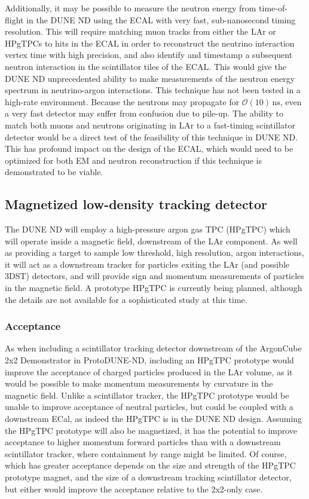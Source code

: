 Additionally, it may be possible to measure the neutron energy from time-of-flight in the DUNE ND using the ECAL with very fast, sub-nanosecond timing resolution. This will require matching muon tracks from either the LAr or HPgTPCs to hits in the ECAL in order to reconstruct the neutrino interaction vertex time with high precision, and also identify and timestamp a subsequent neutron interaction in the scintillator tiles of the ECAL. This would give the DUNE ND unprecedented ability to make measurements of the neutron energy spectrum in neutrino-argon interactions. This technique has not been tested in a high-rate environment. Because the neutrons may propagate for $\mathcal{O}\left(10\right)\,\mathrm{ns}$, even a very fast detector may suffer from confusion due to pile-up. The ability to match both muons and neutrons originating in LAr to a fast-timing scintillator detector would be a direct test of the feasibility of this technique in DUNE ND. This has profound impact on the design of the ECAL, which would need to be optimized for both EM and neutron reconstruction if this technique is demonstrated to be viable.
 
\subsection{Magnetized low-density tracking detector}
The DUNE ND will employ a high-pressure argon gas TPC (HPgTPC) which will operate inside a magnetic field, downstream of the LAr component. As well as providing a target to sample low threshold, high resolution, argon interactions, it will act as a downstream tracker for particles exiting the LAr (and possible 3DST) detectors, and will provide sign and momentum measurements of particles in the magnetic field. A prototype HPgTPC is currently being planned, although the details are not available for a sophisticated study at this time.

\subsubsection{Acceptance}
As when including a scintillator tracking detector downstream of the ArgonCube 2x2 Demonstrator in ProtoDUNE-ND, including an HPgTPC prototype would improve the acceptance of charged particles produced in the LAr volume, as it would be possible to make momentum measurements by curvature in the magnetic field. Unlike a scintillator tracker, the HPgTPC prototype would be unable to improve acceptance of neutral particles, but could be coupled with a downstream ECal, as indeed the HPgTPC is in the DUNE ND design. Assuming the HPgTPC prototype will also be magnetized, it has the potential to improve acceptance to higher momentum forward particles than with a downstream scintillator tracker, where containment by range might be limited. Of course, which has greater acceptance depends on the size and strength of the HPgTPC prototype magnet, and the size of a downstream tracking scintillator detector, but either would improve the acceptance relative to the 2x2-only case.

